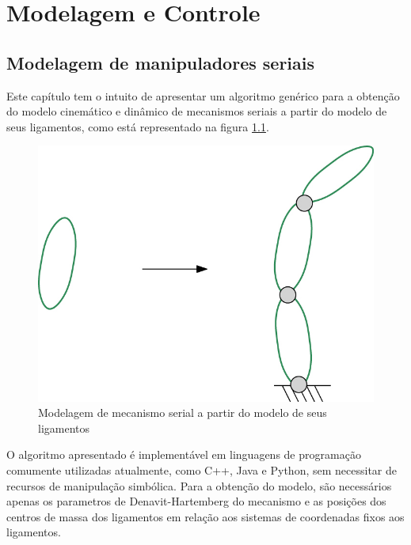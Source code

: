 \documentclass[]{politex}
\begin{document}

\part{Modelagem e Controle}
	
\chapter{Modelagem de manipuladores seriais} \label{cap:Seriais}

Este capítulo tem o intuito de apresentar um algoritmo genérico para a obtenção do modelo cinemático e dinâmico de mecanismos seriais a partir do modelo de seus ligamentos, como está representado na figura \ref{fig:AcoplamentoMecSerialFig}. 
\begin{figure}[h]
	\centering
	\includegraphics[scale=1.0]{imagens/Elo2Serial.jpg}  
	\caption{Modelagem de mecanismo serial a partir do modelo de seus ligamentos}
	\label{fig:AcoplamentoMecSerialFig}
\end{figure}

O algoritmo apresentado é implementável em linguagens de programação comumente utilizadas atualmente, como C++, Java e Python, sem necessitar de recursos de manipulação simbólica. Para a obtenção do modelo, são necessários apenas os parametros de Denavit-Hartemberg \cite{Craig, Denavit, Lipkin, Cabral} do mecanismo e as posições dos centros de massa dos ligamentos em relação aos sistemas de coordenadas fixos aos ligamentos.
\end{document}
